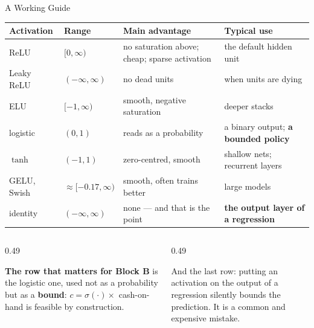 \begin{frame}{A Working Guide}
\vspace{-1mm}
\begin{center}\footnotesize
\begin{tabularx}{\linewidth}{@{}>{\raggedright\arraybackslash}p{2.1cm} >{\raggedright\arraybackslash}p{1.9cm} >{\raggedright\arraybackslash}X >{\raggedright\arraybackslash}p{3.5cm}@{}}
\toprule
\textbf{Activation} & \textbf{Range} & \textbf{Main advantage} & \textbf{Typical use} \\
\midrule
ReLU & $[0,\infty)$ & no saturation above; cheap; sparse activation & the default hidden unit \\
Leaky ReLU & $(-\infty,\infty)$ & no dead units & when units are dying \\
ELU & $[-1,\infty)$ & smooth, negative saturation & deeper stacks \\
logistic & $(0,1)$ & reads as a probability & a binary output; \textbf{a bounded policy} \\
$\tanh$ & $(-1,1)$ & zero-centred, smooth & shallow nets; recurrent layers \\
GELU, Swish & $\approx[-0.17,\infty)$ & smooth, often trains better & large models \\
identity & $(-\infty,\infty)$ & none --- and that is the point & \textbf{the output layer of a regression} \\
\bottomrule
\end{tabularx}
\end{center}
\medskip
\begin{columns}[T]
\begin{column}{0.49\textwidth}
\begin{takeawaybox}\footnotesize
\textbf{The row that matters for Block B} is the logistic one, used not as a probability but as a \textbf{bound}: $c=\sigma(\cdot)\times$ cash-on-hand is feasible by construction.
\end{takeawaybox}
\end{column}
\begin{column}{0.49\textwidth}
\begin{cautionbox}\footnotesize
And the last row: putting an activation on the output of a regression silently bounds the prediction. It is a common and expensive mistake.
\end{cautionbox}
\end{column}
\end{columns}
\vspace{1mm}
\end{frame}

